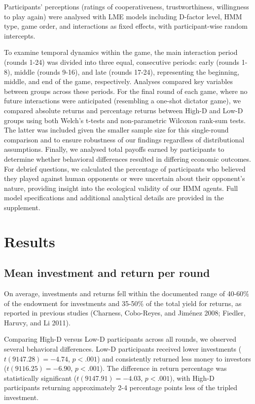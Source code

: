 \documentclass[
]{article}
\begin{document}
Participants' perceptions (ratings of cooperativeness, trustworthiness, willingness to play again) were analysed with LME models including D-factor level, HMM type, game order, and interactions as fixed effects, with participant-wise random intercepts.

To examine temporal dynamics within the game, the main interaction period (rounds 1-24) was divided into three equal, consecutive periods: early (rounds 1-8), middle (rounds 9-16), and late (rounds 17-24), representing the beginning, middle, and end of the game, respectively. Analyses compared key variables between groups across these periods. For the final round of each game, where no future interactions were anticipated (resembling a one-shot dictator game), we compared absolute returns and percentage returns between High-D and Low-D groups using both Welch's t-tests and non-parametric Wilcoxon rank-sum tests. The latter was included given the smaller sample size for this single-round comparison and to ensure robustness of our findings regardless of distributional assumptions. Finally, we analysed total payoffs earned by participants to determine whether behavioral differences resulted in differing economic outcomes. For debrief questions, we calculated the percentage of participants who believed they played against human opponents or were uncertain about their opponent's nature, providing insight into the ecological validity of our HMM agents. Full model specifications and additional analytical details are provided in the supplement.

\section{Results}\label{results}

\subsection{Mean investment and return per round}\label{mean-investment-and-return-per-round}

On average, investments and returns fell within the documented range of 40-60\% of the endowment for investments and 35-50\% of the total yield for returns, as reported in previous studies (Charness, Cobo-Reyes, and Jiménez 2008; Fiedler, Haruvy, and Li 2011).

Comparing High-D versus Low-D participants across all rounds, we observed several behavioral differences. Low-D participants received lower investments (\(t(9147.28) = -4.74\), \(p < .001\)) and consistently returned less money to investors (\(t(9116.25) = -6.90\), \(p < .001\)). The difference in return percentage was statistically significant (\(t(9147.91) = -4.03\), \(p < .001\)), with High-D participants returning approximately 2-4 percentage points less of the tripled investment.
\end{document}
